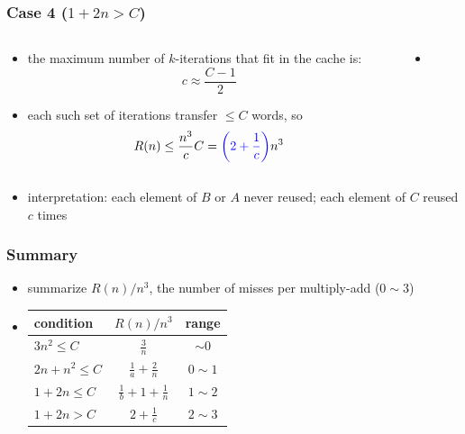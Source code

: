 \documentclass[12pt,dvipdfmx]{beamer}
\newcommand{\ao}[1]{{\color{blue}#1}}
\begin{document}
\begin{frame}
\frametitle{Case 4 ($1 + 2n > C$)}
\begin{columns}
  \begin{column}{0.5\textwidth}
\begin{itemize}
\item the maximum number of $k$-iterations
  that fit in the cache is:
\[ c \approx \frac{C - 1}{2} \]
\item each such set of iterations transfer $\leq C$ words, so
\[ R(n) \leq \frac{n^3}{c} C 
= \ao{\left(2 + \frac{1}{c}\right)} n^3
\]
\end{itemize}
  \end{column}

  \begin{column}{0.5\textwidth}
    \begin{itemize}
    \item []
{\tiny\def\svgwidth{0.9\textwidth}}
\end{itemize}
\end{column}
\end{columns}

\begin{itemize}
\item []
\ao{interpretation:} each element of $B$ or $A$ never reused; each element of $C$
reused $c$ times
\end{itemize}
\end{frame}

\begin{frame}
\frametitle{Summary}
\begin{itemize}
\item summarize $R(n)/n^3$, the number of misses per multiply-add ($0 \sim 3$)
\item []
\begin{center}
\begin{tabular}{|l|c|c|}\hline
condition         & $R(n)/n^3$                      & range      \\\hline
$3n^2 \leq C$     & $\frac{3}{n}$                   & $\sim 0$   \\
$2n + n^2 \leq C$ & $\frac{1}{a} + \frac{2}{n}$     & $0 \sim 1$ \\
$1 + 2n \leq C$   & $\frac{1}{b} + 1 + \frac{1}{n}$ & $1 \sim 2$ \\ 
$1 + 2n > C$      & $2 + \frac{1}{c}$               & $2 \sim 3$ \\\hline
\end{tabular}
\end{center}
\end{itemize}
\end{frame}
\end{document}
